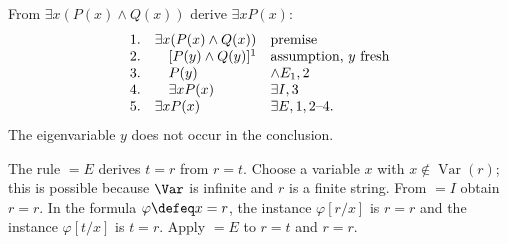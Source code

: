 \begin{example}
From \(\exists x(P(x)\land Q(x))\) derive \(\exists xP(x)\):
\[
\begin{array}{rll}
1.&\exists x(P(x)\land Q(x))&\text{premise}\cr
2.&\quad[P(y)\land Q(y)]^1&\text{assumption, \(y\) fresh}\cr
3.&\quad P(y)&\land E_1,2\cr
4.&\quad\exists xP(x)&\exists I,3\cr
5.&\exists xP(x)&\exists E,1,2\text{--}4.
\end{array}
\]
The eigenvariable \(y\) does not occur in the conclusion.
\end{example}

\begin{example}
The rule \(=E\) derives \(t=r\) from \(r=t\).  Choose a variable \(x\)
with \(x\notin\operatorname{Var}(r)\); this is possible because \(\Var\)
is infinite and \(r\) is a finite string.  From \(=I\) obtain
\(r=r\).  In the formula \(\varphi\defeq x=r\), the instance
\(\varphi[r/x]\) is \(r=r\) and the instance \(\varphi[t/x]\) is
\(t=r\).  Apply \(=E\) to \(r=t\) and \(r=r\).
\end{example}

